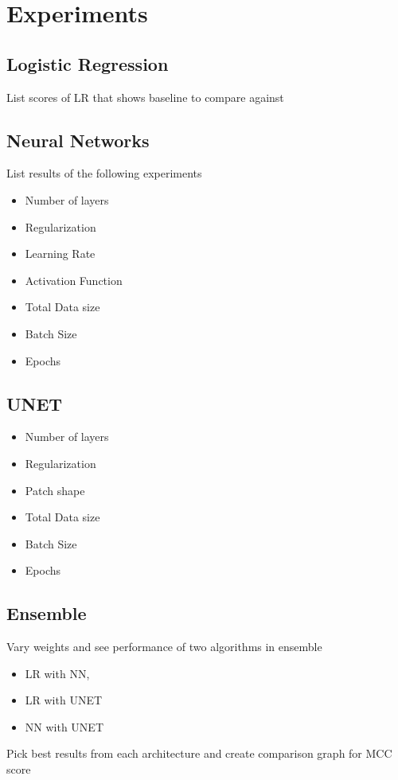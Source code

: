 \section{Experiments}

\subsection{Logistic Regression}
List scores of LR that shows baseline to compare against

\subsection{Neural Networks}

List results of the following experiments

\begin{itemize}
    \item Number of layers
    \item Regularization
    \item Learning Rate
    \item Activation Function
    \item Total Data size
    \item Batch Size
    \item Epochs
\end{itemize}

\subsection{UNET}
\begin{itemize}
    \item Number of layers
    \item Regularization
    \item Patch shape
    \item Total Data size
    \item Batch Size
    \item Epochs
\end{itemize}

\subsection{Ensemble}

Vary weights and see performance of two algorithms in ensemble

\begin{itemize}
    \item LR with NN, 
    \item LR with UNET 
    \item NN with UNET
\end{itemize}

Pick best results from each architecture and create comparison graph for MCC score

